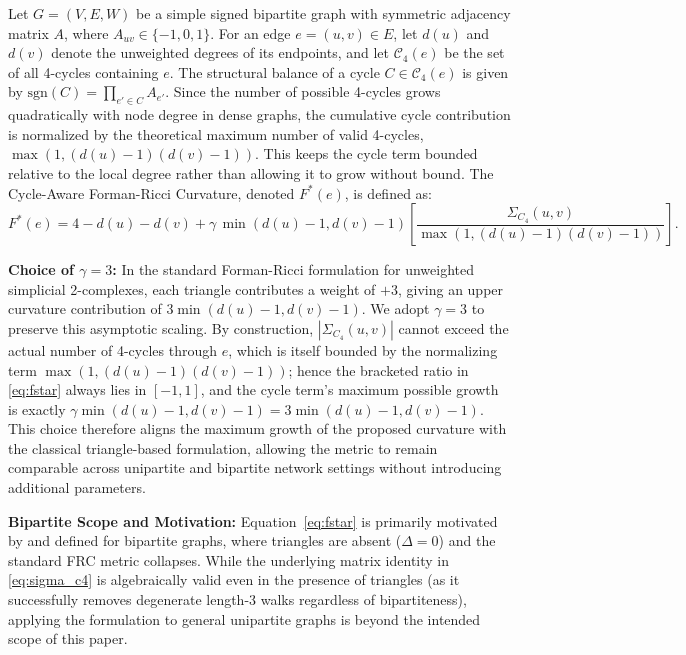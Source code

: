\documentclass{siuro250211}
\theoremstyle{remark}
\theoremstyle{plain}
\begin{document}
\begin{definition} 
\label{def:curvature} Let $G = (V, E, W)$ be a simple signed bipartite graph with symmetric adjacency matrix $A$, where $A_{uv} \in \{-1, 0, 1\}$. For an edge $e=(u,v)\in E$, let $d(u)$ and $d(v)$ denote the unweighted degrees of its endpoints, and let $\mathcal{C}_4(e)$ be the set of all 4-cycles containing $e$. The structural balance of a cycle $C \in \mathcal{C}_4(e)$ is given by $\mathrm{sgn}(C)=\prod_{e'\in C}A_{e'}$. Since the number of possible 4-cycles grows quadratically with node degree in dense graphs, the cumulative cycle contribution is normalized by the theoretical maximum number of valid 4-cycles, $\max(1,(d(u)-1)(d(v)-1))$. This keeps the cycle term bounded relative to the local degree rather than allowing it to grow without bound. The Cycle-Aware Forman-Ricci Curvature, denoted $F^*(e)$, is defined as: 
\begin{equation} 
\label{eq:fstar} F^*(e)=4-d(u)-d(v)+\gamma\,\min(d(u)-1,d(v)-1)\left[\frac{\Sigma_{C_4}(u,v)}{\max(1,(d(u)-1)(d(v)-1))}\right]. \end{equation} 

\vspace{0.5em} 
\noindent \textbf{Choice of $\gamma=3$:} In the standard Forman-Ricci formulation for unweighted simplicial 2-complexes, each triangle contributes a weight of $+3$, giving an upper curvature contribution of $3\min(d(u)-1,d(v)-1)$. We adopt $\gamma=3$ to preserve this asymptotic scaling. By construction, $|\Sigma_{C_4}(u,v)|$ cannot exceed the actual number of 4-cycles through $e$, which is itself bounded by the normalizing term $\max(1,(d(u)-1)(d(v)-1))$; hence the bracketed ratio in \cref{eq:fstar} always lies in $[-1,1]$, and the cycle term's maximum possible growth is exactly $\gamma\min(d(u)-1,d(v)-1)=3\min(d(u)-1,d(v)-1)$. This choice therefore aligns the maximum growth of the proposed curvature with the classical triangle-based formulation, allowing the metric to remain comparable across unipartite and bipartite network settings without introducing additional parameters.

\vspace{0.5em} 
\noindent \textbf{Bipartite Scope and Motivation:} Equation~\eqref{eq:fstar} is primarily motivated by and defined for bipartite graphs, where triangles are absent ($\Delta=0$) and the standard FRC metric collapses. While the underlying matrix identity in \cref{eq:sigma_c4} is algebraically valid even in the presence of triangles (as it successfully removes degenerate length-3 walks regardless of bipartiteness), applying the formulation to general unipartite graphs is beyond the intended scope of this paper.


\end{definition} 
\end{document}
